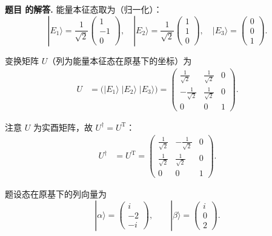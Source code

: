 \documentclass[12pt, a4paper, oneside]{ctexart}
\newcounter{problemname}
\newenvironment{solution}
  {\par\noindent\textbf{题目 \theproblemname 的解答. }}
  {\par}
\begin{document}
\begin{solution}
  能量本征态取为（归一化）：
\[
|E_1\rangle=\frac{1}{\sqrt2}\begin{pmatrix}1\\-1\\0\end{pmatrix},\quad
|E_2\rangle=\frac{1}{\sqrt2}\begin{pmatrix}1\\1\\0\end{pmatrix},\quad
|E_3\rangle=\begin{pmatrix}0\\0\\1\end{pmatrix}.
\]

变换矩阵 \(U\)（列为能量本征态在原基下的坐标）为
\begin{align*}
U &= \big(|E_1\rangle\; |E_2\rangle\; |E_3\rangle\big)
= \begin{pmatrix}
\frac{1}{\sqrt2} & \frac{1}{\sqrt2} & 0\\[4pt]
-\frac{1}{\sqrt2} & \frac{1}{\sqrt2} & 0\\[4pt]
0 & 0 & 1
\end{pmatrix}.
\end{align*}

注意 \(U\) 为实酉矩阵，故 \(U^\dagger=U^{\mathrm T}\)：
\begin{align*}
U^\dagger &= U^{\mathrm T}
= \begin{pmatrix}
\frac{1}{\sqrt2} & -\frac{1}{\sqrt2} & 0\\[4pt]
\frac{1}{\sqrt2} & \frac{1}{\sqrt2} & 0\\[4pt]
0 & 0 & 1
\end{pmatrix}.
\end{align*}

题设态在原基下的列向量为
\[
|\alpha\rangle=\begin{pmatrix} i\\[2pt] -2\\[2pt] -i \end{pmatrix},\qquad
|\beta\rangle=\begin{pmatrix} i\\[2pt] 0\\[2pt] 2 \end{pmatrix}.
\]


\end{solution}
\end{document}
